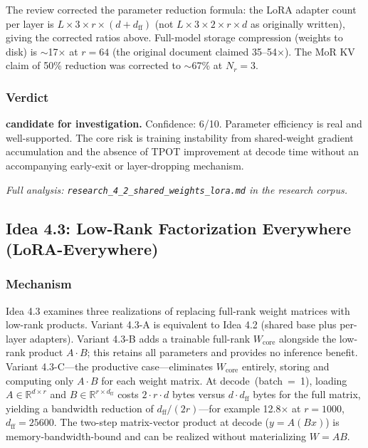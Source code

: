 \documentclass[11pt]{article}
\begin{document}
The review corrected the parameter reduction formula: the LoRA adapter count per layer is $L \times 3 \times r \times (d + d_{\text{ff}})$ (not $L \times 3 \times 2 \times r \times d$ as originally written), giving the corrected ratios above. Full-model storage compression (weights to disk) is $\sim$17$\times$ at $r{=}64$ (the original document claimed 35--54$\times$). The MoR KV claim of 50\% reduction was corrected to $\sim$67\% at $N_r{=}3$.

\subsubsection*{Verdict}

\noindent\textbf{candidate for investigation.} Confidence: 6/10. Parameter efficiency is real and well-supported. The core risk is training instability from shared-weight gradient accumulation and the absence of TPOT improvement at decode time without an accompanying early-exit or layer-dropping mechanism.

\par\noindent\textit{Full analysis: \texttt{research\_4\_2\_shared\_weights\_lora.md} in the research corpus.}


\subsection{Idea 4.3: Low-Rank Factorization Everywhere (LoRA-Everywhere)}
\label{subsec:idea43}

\subsubsection*{Mechanism}

Idea 4.3 examines three realizations of replacing full-rank weight matrices with low-rank products. Variant 4.3-A is equivalent to Idea 4.2 (shared base plus per-layer adapters). Variant 4.3-B adds a trainable full-rank $W_{\text{core}}$ alongside the low-rank product $A \cdot B$; this retains all parameters and provides no inference benefit. Variant 4.3-C---the productive case---eliminates $W_{\text{core}}$ entirely, storing and computing only $A \cdot B$ for each weight matrix. At decode~(batch~=~1), loading $A \in \mathbb{R}^{d \times r}$ and $B \in \mathbb{R}^{r \times d_{\text{ff}}}$ costs $2 \cdot r \cdot d$ bytes versus $d \cdot d_{\text{ff}}$ bytes for the full matrix, yielding a bandwidth reduction of $d_{\text{ff}} / (2r)$---for example 12.8$\times$ at $r{=}1000$, $d_{\text{ff}}{=}25600$. The two-step matrix-vector product at decode ($y = A(Bx)$) is memory-bandwidth-bound and can be realized without materializing $W = AB$.
\end{document}
